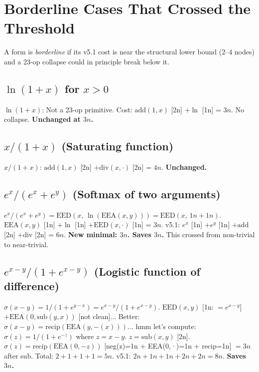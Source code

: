 \documentclass[11pt]{article}
\begin{document}
\section{Borderline Cases That Crossed the Threshold}

A form is \emph{borderline} if its v5.1 cost is near the structural lower bound
(2--4 nodes) and a 23-op collapse could in principle break below it.

\subsection{$\ln(1+x)$ for $x>0$}

$\ln(1+x)$: Not a 23-op primitive. Cost: $\mathrm{add}(1,x)$ [2n] $+\ln$ [1n] = $3n$.
No collapse. \textbf{Unchanged at $3n$.}

\subsection{$x/(1+x)$ (Saturating function)}

$x/(1+x)$: $\mathrm{add}(1,x)$ [2n] $+\mathrm{div}(x,\cdot)$ [2n] = $4n$. \textbf{Unchanged.}

\subsection{$e^x/(e^x+e^y)$ (Softmax of two arguments)}

$e^x/(e^x+e^y)=\mathrm{EED}(x,\,\ln(\mathrm{EEA}(x,y)))=\mathrm{EED}(x,\,1n+1n)$.
$\mathrm{EEA}(x,y)$ [1n] $+\ln$ [1n] $+\mathrm{EED}(x,\cdot)$ [1n] = $3n$.
v5.1: $e^x$ [1n] $+e^y$ [1n] $+\mathrm{add}$ [2n] $+\mathrm{div}$ [2n] = $6n$.
\textbf{New minimal: $3n$. Saves $3n$.} This crossed from non-trivial to near-trivial.

\subsection{$e^{x-y}/(1+e^{x-y})$ (Logistic function of difference)}

$\sigma(x-y)=1/(1+e^{y-x})=e^{x-y}/(1+e^{x-y})$.
$\mathrm{EED}(x,y)$ [1n: $=e^{x-y}$] $+\mathrm{EEA}(0,\mathrm{sub}(y,x))$ [not clean]...
Better: $\sigma(x-y)=\mathrm{recip}(\mathrm{EEA}(y,-(x)))$... hmm let's compute:
$\sigma(z)=1/(1+e^{-z})$ where $z=x-y$.
$z=\mathrm{sub}(x,y)$ [2n].
$\sigma(z)=\mathrm{recip}(\mathrm{EEA}(0,-z))$ [neg(z)=1n + EEA(0,·)=1n + recip=1n] $=3n$ after sub.
Total: $2+1+1+1=5n$.
v5.1: $2n+1n+1n+2n+2n=8n$. \textbf{Saves $3n$.}
\end{document}
